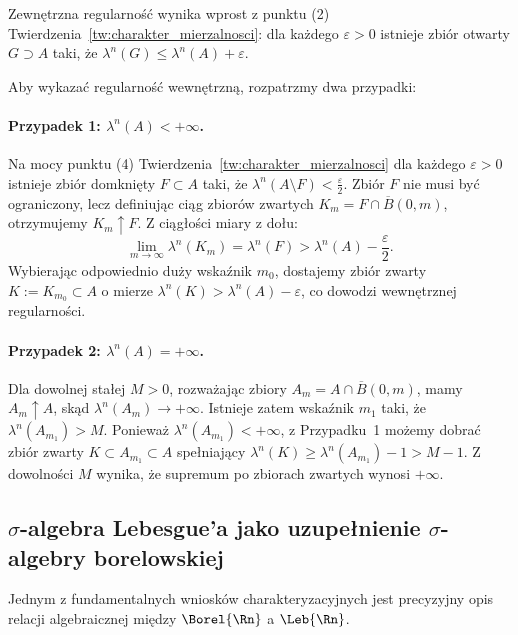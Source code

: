 \begin{dow}
    Zewnętrzna regularność wynika wprost z punktu (2) Twierdzenia~\ref{tw:charakter_mierzalnosci}: dla każdego $\varepsilon > 0$ istnieje zbiór otwarty $G \supset A$ taki, że $\lambda^n(G) \le \lambda^n(A) + \varepsilon$.

    Aby wykazać regularność wewnętrzną, rozpatrzmy dwa przypadki:
    \paragraph{Przypadek 1: $\lambda^n(A) < +\infty$.}
    Na mocy punktu (4) Twierdzenia~\ref{tw:charakter_mierzalnosci} dla każdego $\varepsilon > 0$ istnieje zbiór domknięty $F \subset A$ taki, że $\lambda^n(A \setminus F) < \frac{\varepsilon}{2}$. Zbiór $F$ nie musi być ograniczony, lecz definiując ciąg zbiorów zwartych $K_m = F \cap \overline{B}(0, m)$, otrzymujemy $K_m \uparrow F$. Z ciągłości miary z dołu:
    \begin{equation*}
        \lim_{m \to \infty} \lambda^n(K_m) = \lambda^n(F) > \lambda^n(A) - \frac{\varepsilon}{2}.
    \end{equation*}
    Wybierając odpowiednio duży wskaźnik $m_0$, dostajemy zbiór zwarty $K := K_{m_0} \subset A$ o mierze $\lambda^n(K) > \lambda^n(A) - \varepsilon$, co dowodzi wewnętrznej regularności.

    \paragraph{Przypadek 2: $\lambda^n(A) = +\infty$.}
    Dla dowolnej stałej $M > 0$, rozważając zbiory $A_m = A \cap \overline{B}(0, m)$, mamy $A_m \uparrow A$, skąd $\lambda^n(A_m) \to +\infty$. Istnieje zatem wskaźnik $m_1$ taki, że $\lambda^n(A_{m_1}) > M$. Ponieważ $\lambda^n(A_{m_1}) < +\infty$, z Przypadku~1 możemy dobrać zbiór zwarty $K \subset A_{m_1} \subset A$ spełniający $\lambda^n(K) \ge \lambda^n(A_{m_1}) - 1 > M - 1$. Z dowolności $M$ wynika, że supremum po zbiorach zwartych wynosi $+\infty$.
\end{dow}

\subsection{$\sigma$-algebra Lebesgue'a jako uzupełnienie $\sigma$-algebry borelowskiej}

Jednym z fundamentalnych wniosków charakteryzacyjnych jest precyzyjny opis relacji algebraicznej między $\Borel{\Rn}$ a $\Leb{\Rn}$.

